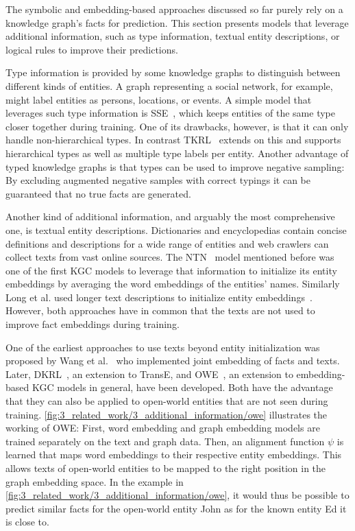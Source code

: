 The symbolic and embedding-based approaches discussed so far purely rely on a knowledge graph's facts for prediction. This section presents models that leverage additional information, such as type information, textual entity descriptions, or logical rules to improve their predictions.

Type information is provided by some knowledge graphs to distinguish between different kinds of entities. A graph representing a social network, for example, might label entities as persons, locations, or events. A simple model that leverages such type information is SSE~\cite{Guo2015SemanticallySK}, which keeps entities of the same type closer together during training. One of its drawbacks, however, is that it can only handle non-hierarchical types. In contrast TKRL~\cite{Xie2016RepresentationLO} extends on this and supports hierarchical types as well as multiple type labels per entity. Another advantage of typed knowledge graphs is that types can be used to improve negative sampling: By excluding augmented negative samples with correct typings it can be guaranteed that no true facts are generated.

Another kind of additional information, and arguably the most comprehensive one, is textual entity descriptions. Dictionaries and encyclopedias contain concise definitions and descriptions for a wide range of entities and web crawlers can collect texts from vast online sources. The NTN~\cite{Socher2013ReasoningWN} model mentioned before was one of the first KGC models to leverage that information to initialize its entity embeddings by averaging the word embeddings of the entities' names. Similarly Long et al. used longer text descriptions to initialize entity embeddings~\cite{Long2016LeveragingLR}. However, both approaches have in common that the texts are not used to improve fact embeddings during training.

One of the earliest approaches to use texts beyond entity initialization was proposed by Wang et al.~\cite{Wang2014KnowledgeGE} who implemented joint embedding of facts and texts. Later, DKRL~\cite{Xie2016RepresentationLO}, an extension to TransE, and OWE~\cite{Shah2019AnOE}, an extension to embedding-based KGC models in general, have been developed. Both have the advantage that they can also be applied to open-world entities that are not seen during training. \autoref{fig:3_related_work/3_additional_information/owe} illustrates the working of OWE: First, word embedding and graph embedding models are trained separately on the text and graph data. Then, an alignment function $\psi$ is learned that maps word embeddings to their respective entity embeddings. This allows texts of open-world entities to be mapped to the right position in the graph embedding space. In the example in \autoref{fig:3_related_work/3_additional_information/owe}, it would thus be possible to predict similar facts for the open-world entity John as for the known entity Ed it is close to.

